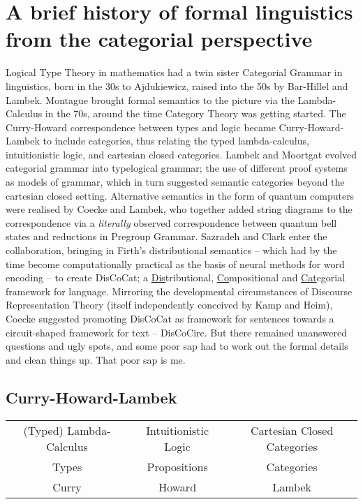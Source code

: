 \section{A brief history of formal linguistics from the categorial perspective}\label{sec:linghist}

 Logical Type Theory in mathematics had a twin sister Categorial Grammar in linguistics, born in the 30s to Ajdukiewicz, raised into the 50s by Bar-Hillel and Lambek. Montague brought formal semantics to the picture via the Lambda-Calculus in the 70s, around the time Category Theory was getting started. The Curry-Howard correspondence between types and logic became Curry-Howard-Lambek to include categories, thus relating the typed lambda-calculus, intuitionistic logic, and cartesian closed categories. Lambek and Moortgat evolved categorial grammar into typelogical grammar; the use of different proof systems as models of grammar, which in turn suggested semantic categories beyond the cartesian closed setting. Alternative semantics in the form of quantum computers were realised by Coecke and Lambek, who together added string diagrams to the correspondence via a \emph{literally} observed correspondence between quantum bell states and reductions in Pregroup Grammar. Sazradeh and Clark enter the collaboration, bringing in Firth's distributional semantics -- which had by the time become computationally practical as the basis of neural methods for word encoding -- to create DisCoCat; a \underline{Dis}tributional, \underline{Co}mpositional and \underline{Cat}egorial framework for language. Mirroring the developmental circumstances of Discourse Representation Theory (itself independently conceived by Kamp and Heim), Coecke suggested promoting DisCoCat as framework for sentences towards a circuit-shaped framework for text -- DisCoCirc. But there remained unanswered questions and ugly spots, and some poor sap had to work out the formal details and clean things up. That poor sap is me.

\subsection{Curry-Howard-Lambek}

\begin{table}[]
\begin{tabular}{ccc}
(Typed) Lambda-Calculus & Intuitionistic Logic & Cartesian Closed Categories  \\
 Types & Propositions & Categories  \\
 Curry & Howard & Lambek 
\end{tabular}
\end{table}

